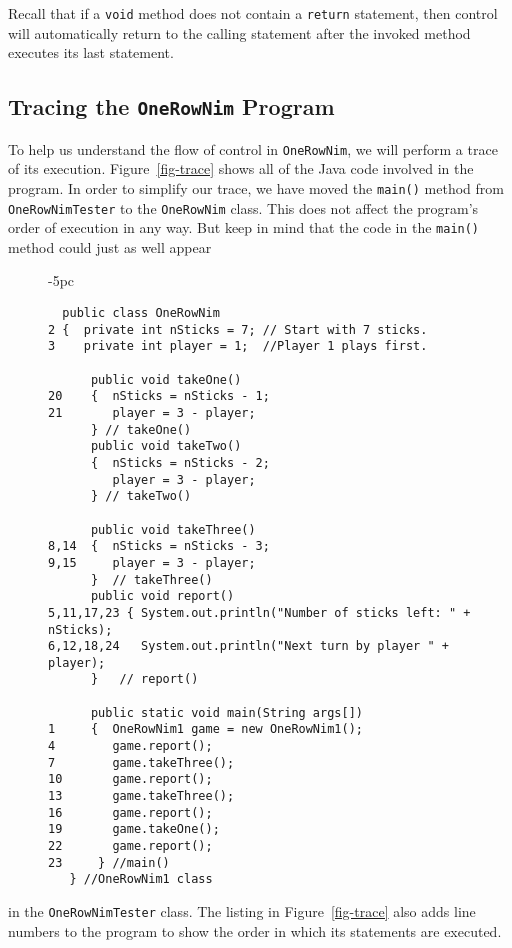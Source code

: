 \noindent Recall that if a {\tt void}
method does not contain a {\tt return} statement, then control will
automatically return to the calling statement after the invoked method
executes its last statement.


\subsection{Tracing the {\tt OneRowNim} Program}
\label{subsect-trace}

\noindent To help us understand the flow of control in {\tt OneRowNim}, 
we will perform a trace of its execution. Figure~\ref{fig-trace} shows
all of the Java code involved in the program. In order to simplify our
trace, we have moved the {\tt main()} method from {\tt
OneRowNimTester} to the {\tt OneRowNim} class. This does not affect
the program's order of execution in any way. But keep in mind that the
code in the {\tt main()} method could just as well appear

\begin{figure}[tb]
\jjjprogstart
\begin{jjjlistingleft}[31pc]{-5pc}
\begin{lstlisting}
  public class OneRowNim 
2 {  private int nSticks = 7; // Start with 7 sticks.
3    private int player = 1;  //Player 1 plays first.

      public void takeOne()
20    {  nSticks = nSticks - 1;
21       player = 3 - player;  
      } // takeOne()
      public void takeTwo()
      {  nSticks = nSticks - 2;
         player = 3 - player; 
      } // takeTwo()

      public void takeThree()
8,14  {  nSticks = nSticks - 3;
9,15     player = 3 - player; 
      }  // takeThree()
      public void report()
5,11,17,23 { System.out.println("Number of sticks left: " + nSticks);
6,12,18,24   System.out.println("Next turn by player " + player);
      }   // report()

      public static void main(String args[])
1     {  OneRowNim1 game = new OneRowNim1();
4        game.report();
7        game.takeThree();
10       game.report();
13       game.takeThree();
16       game.report();
19       game.takeOne();
22       game.report();
23     } //main()
   } //OneRowNim1 class
\end{lstlisting}
\end{jjjlistingleft}
\end{figure}
in the {\tt OneRowNimTester} class.  The listing in
Figure~\ref{fig-trace} also adds line numbers to the program to show
the order in which its statements are executed.

